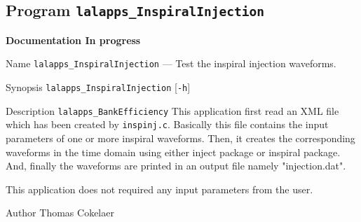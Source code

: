 \subsection{Program \texttt{lalapps\_InspiralInjection}}
\label{program:lalapps-BankEfficiency}
{\LARGE{{\bf Documentation In progress}}}

\begin{entry}

\item[Name]
\verb$lalapps_InspiralInjection$ --- Test the inspiral injection waveforms.

\item[Synopsis]
\verb$lalapps_InspiralInjection$ [\verb$-h$] 

\item[Description]
\verb$lalapps_BankEfficiency$ This application first read an XML file which has been created
by \texttt{inspinj.c}. Basically this file contains the input parameters of one or more
 inspiral waveforms. Then, it creates the corresponding waveforms in the time domain using 
either inject package or inspiral package. And, finally the waveforms are printed in an output
 file namely "injection.dat". 

This application does not required any input parameters from the user. 




\item[Author]
Thomas Cokelaer

\end{entry}
